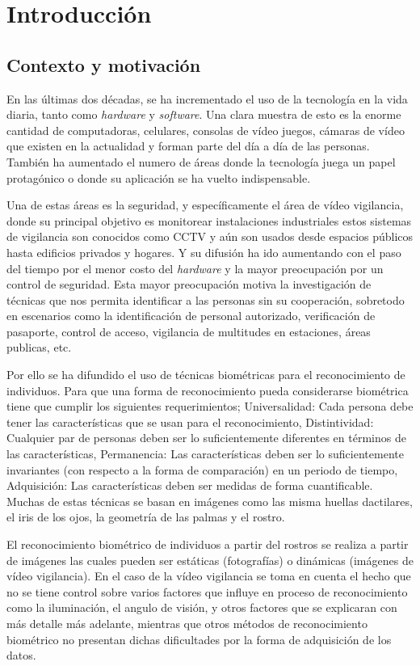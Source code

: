 \chapter{Introducción}

\section{Contexto y motivación}
En las últimas dos décadas, se ha incrementado el uso de la tecnología en la vida diaria, tanto como \textit{hardware} y \textit{software}. Una clara muestra de esto es la enorme cantidad de computadoras, celulares, consolas de vídeo juegos, cámaras de vídeo que existen en la actualidad y forman parte del día a día de las personas. También ha aumentado el numero de áreas donde la tecnología juega un papel protagónico o donde su aplicación se ha vuelto indispensable.

Una de estas áreas es la seguridad, y específicamente el área de vídeo vigilancia, donde su principal objetivo es monitorear instalaciones industriales estos sistemas de vigilancia son conocidos como \ac{CCTV} y aún son usados desde espacios públicos hasta edificios privados y hogares. Y su difusión ha ido aumentando con el paso del tiempo por el menor costo del \textit{hardware} y la mayor preocupación por un control de seguridad. Esta mayor preocupación motiva la investigación de técnicas que nos permita identificar a las personas sin su cooperación, sobretodo en escenarios como la identificación de personal autorizado, verificación de pasaporte, control de acceso, vigilancia de multitudes en estaciones, áreas publicas, etc.

Por ello se ha difundido el uso de técnicas biométricas para el reconocimiento de individuos. Para que una forma de reconocimiento pueda considerarse biométrica tiene que cumplir los siguientes requerimientos; Universalidad: Cada persona debe tener las características que se usan para el reconocimiento, Distintividad: Cualquier par de personas deben ser lo suficientemente diferentes en términos de las características, Permanencia: Las características deben ser lo suficientemente invariantes (con respecto a la forma de comparación) en un periodo de tiempo, Adquisición: Las características deben ser medidas de forma cuantificable.%
Muchas de estas técnicas se basan en imágenes como las misma huellas dactilares, el iris de los ojos, la geometría de las palmas y el rostro. 

El reconocimiento biométrico de individuos a partir del rostros se realiza a partir de imágenes las cuales pueden ser estáticas (fotografías) o dinámicas (imágenes de vídeo vigilancia). En el caso de la vídeo vigilancia se toma en cuenta el hecho que no se tiene control sobre varios factores que influye en proceso de reconocimiento como la iluminación, el angulo de visión, y otros factores que se explicaran con más detalle más adelante, mientras que otros métodos de reconocimiento biométrico no presentan dichas dificultades por la forma de adquisición de los datos.


